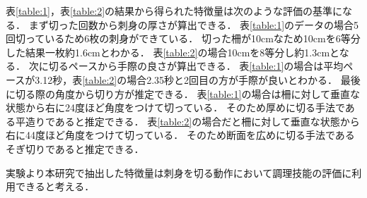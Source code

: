 \begin{table}[ht]
    \centering
    \caption{2回目の特徴量}
    \label{table:2}
\end{table}
表\ref{table:1}，表\ref{table:2}の結果から得られた特徴量は次のような評価の基準になる．
まず切った回数から刺身の厚さが算出できる．
表\ref{table:1}のデータの場合5回切っているため6枚の刺身ができている．
切った柵が10cmなため10cmを6等分した結果一枚約1.6cmとわかる．
表\ref{table:2}の場合10cmを8等分し約1.3cmとなる．
次に切るペースから手際の良さが算出できる．
表\ref{table:1}の場合は平均ペースが3.12秒，表\ref{table:2}の場合2.35秒と2回目の方が手際が良いとわかる．
最後に切る際の角度から切り方が推定できる．
表\ref{table:1}の場合は柵に対して垂直な状態から右に24度ほど角度をつけて切っている．
そのため厚めに切る手法である平造りであると推定できる．
表\ref{table:2}の場合だと柵に対して垂直な状態から右に44度ほど角度をつけて切っている．
そのため断面を広めに切る手法であるそぎ切りであると推定できる．

実験より本研究で抽出した特徴量は刺身を切る動作において調理技能の評価に利用できると考える．

